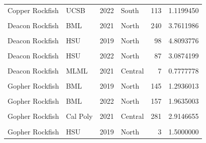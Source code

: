 \documentclass[
]{article}
\begin{document}
\begin{longtable}[t]{llrlrr}
Copper Rockfish & UCSB & 2022 & South & 113 & 1.1199450\\
\cellcolor{gray!6}{Deacon Rockfish} & \cellcolor{gray!6}{BML} & \cellcolor{gray!6}{2019} & \cellcolor{gray!6}{North} & \cellcolor{gray!6}{456} & \cellcolor{gray!6}{5.0817916}\\
Deacon Rockfish & BML & 2021 & North & 240 & 3.7611986\\
\addlinespace
\cellcolor{gray!6}{Deacon Rockfish} & \cellcolor{gray!6}{BML} & \cellcolor{gray!6}{2022} & \cellcolor{gray!6}{North} & \cellcolor{gray!6}{290} & \cellcolor{gray!6}{6.2546744}\\
Deacon Rockfish & HSU & 2019 & North & 98 & 4.8093776\\
\cellcolor{gray!6}{Deacon Rockfish} & \cellcolor{gray!6}{HSU} & \cellcolor{gray!6}{2021} & \cellcolor{gray!6}{North} & \cellcolor{gray!6}{145} & \cellcolor{gray!6}{6.4332095}\\
Deacon Rockfish & HSU & 2022 & North & 87 & 3.0874199\\
\cellcolor{gray!6}{Deacon Rockfish} & \cellcolor{gray!6}{MLML} & \cellcolor{gray!6}{2019} & \cellcolor{gray!6}{Central} & \cellcolor{gray!6}{7} & \cellcolor{gray!6}{0.6737005}\\
\addlinespace
Deacon Rockfish & MLML & 2021 & Central & 7 & 0.7777778\\
\cellcolor{gray!6}{Deacon Rockfish} & \cellcolor{gray!6}{MLML} & \cellcolor{gray!6}{2022} & \cellcolor{gray!6}{Central} & \cellcolor{gray!6}{1} & \cellcolor{gray!6}{0.3329634}\\
Gopher Rockfish & BML & 2019 & North & 145 & 1.2936013\\
\cellcolor{gray!6}{Gopher Rockfish} & \cellcolor{gray!6}{BML} & \cellcolor{gray!6}{2021} & \cellcolor{gray!6}{North} & \cellcolor{gray!6}{270} & \cellcolor{gray!6}{3.0292968}\\
Gopher Rockfish & BML & 2022 & North & 157 & 1.9635003\\
\addlinespace
\cellcolor{gray!6}{Gopher Rockfish} & \cellcolor{gray!6}{Cal Poly} & \cellcolor{gray!6}{2019} & \cellcolor{gray!6}{Central} & \cellcolor{gray!6}{401} & \cellcolor{gray!6}{2.6063087}\\
Gopher Rockfish & Cal Poly & 2021 & Central & 281 & 2.9146655\\
\cellcolor{gray!6}{Gopher Rockfish} & \cellcolor{gray!6}{Cal Poly} & \cellcolor{gray!6}{2022} & \cellcolor{gray!6}{Central} & \cellcolor{gray!6}{417} & \cellcolor{gray!6}{3.4523480}\\
Gopher Rockfish & HSU & 2019 & North & 3 & 1.5000000\\

\end{longtable}
\end{document}
